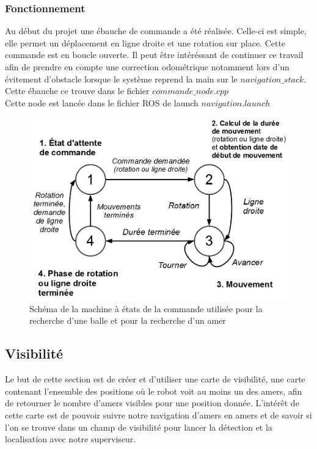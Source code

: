 \documentclass[10pt,a4paper]{article}
\begin{document}
\subsubsection*{Fonctionnement}

Au début du projet une ébauche de commande a été réalisée. Celle-ci est simple, elle permet un déplacement en ligne droite et une rotation sur place. Cette commande est en boucle ouverte. Il peut \^etre intéréssant de continuer ce travail afin de prendre en compte une correction odométrique notamment lors d'un évitement d'obstacle lorsque le système reprend la main sur le $navigation\_stack$.\\
Cette ébauche ce trouve dans le fichier $commande\_node.cpp$ \\
Cette node est lancée dans le fichier ROS de launch $navigation.launch$


\begin{figure}[!h]
\centering\includegraphics[scale=0.4]{figures/commande_MEF.png}
\caption{Schéma de la machine à états de la commande utilisée pour la recherche d'une balle et pour la recherche d'un amer}
\label{commande_MEF}
\end{figure}

\subsection{Visibilité}
\label{sec:Visibilite}

Le but de cette section est de créer et d'utiliser une carte de visibilité, une carte contenant l'ensemble des positions où le robot voit au moins un des amers, afin de retourner le nombre d'amers visibles pour une position donnée. L’intérêt de cette carte est de pouvoir suivre notre navigation d'amers en amers et de savoir si l'on se trouve dans un champ de visibilité pour lancer la détection et la localisation avec notre superviseur.
\end{document}
